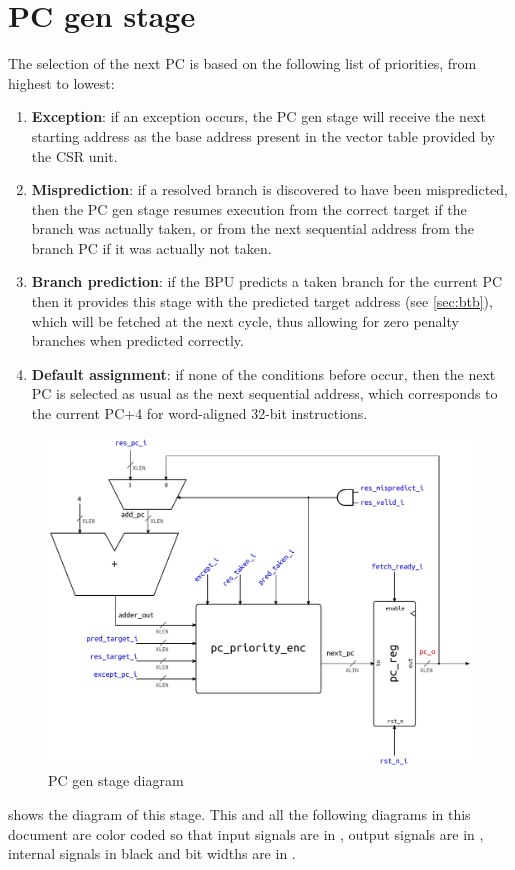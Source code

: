 \section{\acs{PC} gen stage}
The selection of the next \ac{PC} is based on the following list of priorities, from highest to lowest:
\begin{enumerate}
  \item \textbf{Exception}: if an exception occurs, the \ac{PC} gen stage will receive the next starting address as the base address present in the vector table provided by the {\smaller CSR} unit.
  \item \textbf{Misprediction}: if a resolved branch is discovered to have been mispredicted, then the \ac{PC} gen stage resumes execution from the correct target if the branch was actually taken, or from the next sequential address from the branch \ac{PC} if it was actually not taken.
  \item \textbf{Branch prediction}: if the \ac{BPU} predicts a taken branch for the current \ac{PC} then it provides this stage with the predicted target address (see \cref{sec:btb}), which will be fetched at the next cycle, thus allowing for zero penalty branches when predicted correctly.
  \item \textbf{Default assignment}: if none of the conditions before occur, then the next \ac{PC} is selected as usual as the next sequential address, which corresponds to the current \ac{PC}+4 for word-aligned 32-bit instructions.
\end{enumerate}

\begin{figure}[hbt]
  \centering
  \includegraphics[width=\textwidth]{img/pc_gen_stage.pdf}
  \caption{\acs{PC} gen stage diagram}
  \label{fig:pc_gen_stage}
\end{figure}
 shows the diagram of this stage. This and all the following diagrams in this document are color coded so that input signals are in {\color{input_blue}{blue}}, output signals are in {\color{output_red}{red}}, internal signals in black and bit widths are in {\color{width_gray}{gray}}.

